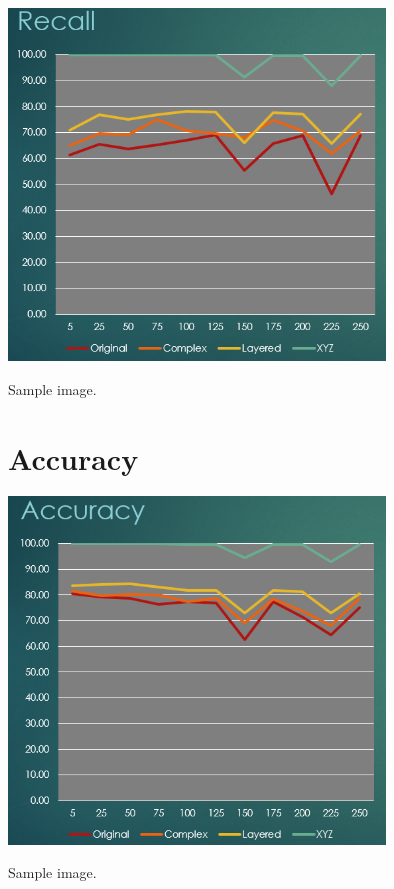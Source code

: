 \documentclass[]{report}
\begin{document}
\begin{minipage}{\linewidth}
	\begin{minipage}{0.49\textwidth}
		\centering
		\includegraphics[width=0.75\textwidth]{../images/recall}
	\end{minipage}
	\hfill
	\begin{minipage}{0.49\textwidth}
		\centering
		Sample image.
	\end{minipage}
\end{minipage}

\section{Accuracy}

\begin{minipage}{\linewidth}
	\begin{minipage}{0.49\textwidth}
		\centering
		\includegraphics[width=0.75\textwidth]{../images/accuracy}
	\end{minipage}
	\hfill
	\begin{minipage}{0.49\textwidth}
		\centering
		Sample image.
	\end{minipage}
\end{minipage}
\end{document}
